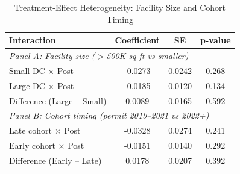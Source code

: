 \begin{table}[htbp]
\centering
\caption{Treatment-Effect Heterogeneity: Facility Size and Cohort Timing}
\label{tab:appx_heterogeneity}
\small
\begin{tabular}{lccc}
\toprule
Interaction & Coefficient & SE & p-value \\
\midrule
\multicolumn{4}{l}{\textit{Panel A: Facility size ($>$500K sq ft vs smaller)}} \\
Small DC $\times$ Post & -0.0273 & 0.0242 & 0.268 \\
Large DC $\times$ Post & -0.0185 & 0.0120 & 0.134 \\
Difference (Large -- Small) & 0.0089 & 0.0165 & 0.592 \\
\midrule
\multicolumn{4}{l}{\textit{Panel B: Cohort timing (permit 2019--2021 vs 2022+)}} \\
Late cohort $\times$ Post & -0.0328 & 0.0274 & 0.241 \\
Early cohort $\times$ Post & -0.0151 & 0.0140 & 0.292 \\
Difference (Early -- Late) & 0.0178 & 0.0207 & 0.392 \\
\bottomrule
\end{tabular}
\end{table}
